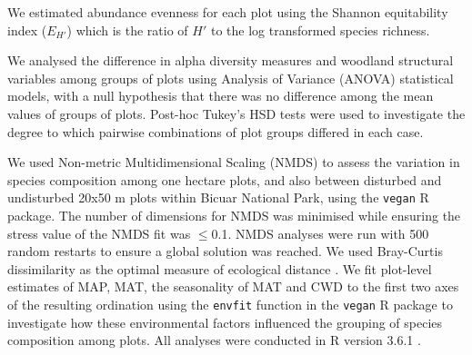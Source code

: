 \begin{refsection}
We estimated abundance evenness for each plot using the Shannon equitability index ($E_{H'}$) \citep{Smith1996} which is the ratio of $H'$ to the log transformed species richness.

We analysed the difference in alpha diversity measures and woodland structural variables among groups of plots using Analysis of Variance (ANOVA) statistical models, with a null hypothesis that there was no difference among the mean values of groups of plots. Post-hoc Tukey's HSD tests were used to investigate the degree to which pairwise combinations of plot groups differed in each case.

We used Non-metric Multidimensional Scaling (NMDS) to assess the variation in species composition among one hectare plots, and also between disturbed and undisturbed 20x50 m plots within Bicuar National Park, using the \texttt{vegan} R package. The number of dimensions for NMDS was minimised while ensuring the stress value of the NMDS fit was $\le$0.1. NMDS analyses were run with 500 random restarts to ensure a global solution was reached. We used Bray-Curtis dissimilarity as the optimal measure of ecological distance \citep{Legendre2013}. We fit plot-level estimates of MAP, MAT, the seasonality of MAT and CWD to the first two axes of the resulting ordination using the \texttt{envfit} function in the \texttt{vegan} R package to investigate how these environmental factors influenced the grouping of species composition among plots. All analyses were conducted in R version 3.6.1 \citep{R2020}.



\end{refsection}
